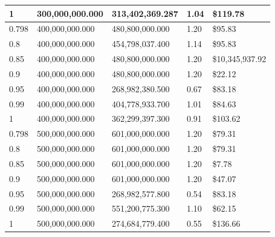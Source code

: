\begin{table}[H]
\begin{tabular}{|l|l|l|l|l|}
        1 & 300,000,000.000 & 313,402,369.287 & 1.04 &  \$119.78  \\ \hline
        0.798 & 400,000,000.000 & 480,800,000.000 & 1.20 &  \$95.83  \\ \hline
        0.8 & 400,000,000.000 & 454,798,037.400 & 1.14 &  \$95.83  \\ \hline
        0.85 & 400,000,000.000 & 480,800,000.000 & 1.20 &  \$10,345,937.92  \\ \hline
        0.9 & 400,000,000.000 & 480,800,000.000 & 1.20 &  \$22.12  \\ \hline
        0.95 & 400,000,000.000 & 268,982,380.500 & 0.67 &  \$83.18  \\ \hline
        0.99 & 400,000,000.000 & 404,778,933.700 & 1.01 &  \$84.63  \\ \hline
        1 & 400,000,000.000 & 362,299,397.300 & 0.91 &  \$103.62  \\ \hline
        0.798 & 500,000,000.000 & 601,000,000.000 & 1.20 &  \$79.31  \\ \hline
        0.8 & 500,000,000.000 & 601,000,000.000 & 1.20 &  \$79.31  \\ \hline
        0.85 & 500,000,000.000 & 601,000,000.000 & 1.20 &  \$7.78  \\ \hline
        0.9 & 500,000,000.000 & 601,000,000.000 & 1.20 &  \$47.07  \\ \hline
        0.95 & 500,000,000.000 & 268,982,577.800 & 0.54 &  \$83.18  \\ \hline
        0.99 & 500,000,000.000 & 551,200,775.300 & 1.10 &  \$62.15  \\ \hline
        1 & 500,000,000.000 & 274,684,779.400 & 0.55 &  \$136.66  \\ \hline
\end{tabular}
\end{table}


